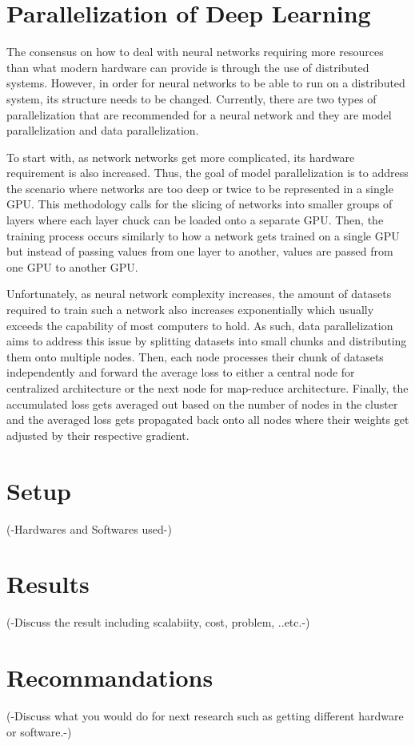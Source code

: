 \documentclass{IEEEtran}
\begin{document}
    \section{Parallelization of Deep Learning}
        The consensus on how to deal with neural networks requiring more resources than what modern hardware can provide is through the use of distributed systems. However, in order for neural networks to be able to run on a distributed system, its structure needs to be changed. Currently, there are two types of parallelization that are recommended for a neural network and they are model parallelization and data parallelization.

        To start with, as network networks get more complicated, its hardware requirement is also increased. Thus, the goal of model parallelization is to address the scenario where networks are too deep or twice to be represented in a single GPU. This methodology calls for the slicing of networks into smaller groups of layers where each layer chuck can be loaded onto a separate GPU. Then, the training process occurs similarly to how a network gets trained on a single GPU but instead of passing values from one layer to another, values are passed from one GPU to another GPU\cite{ben-nun_hoefler_2019}.

        Unfortunately, as neural network complexity increases, the amount of datasets required to train such a network also increases exponentially which usually exceeds the capability of most computers to hold. As such, data parallelization aims to address this issue by splitting datasets into small chunks and distributing them onto multiple nodes. Then, each node processes their chunk of datasets independently and forward the average loss to either a central node for centralized architecture or the next node for map-reduce architecture. Finally, the accumulated loss gets averaged out based on the number of nodes in the cluster and the averaged loss gets propagated back onto all nodes where their weights get adjusted by their respective gradient\cite{ben-nun_hoefler_2019}.

    \section{Setup}
        (-Hardwares and Softwares used-)

    \section{Results}
        (-Discuss the result including scalabiity, cost, problem, ..etc.-)

    \section{Recommandations}
        (-Discuss what you would do for next research such as getting different hardware or software.-)\nocite{*}

    
    
    
\end{document}
